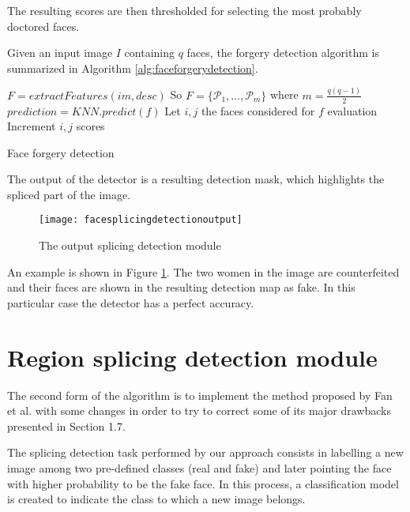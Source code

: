 The resulting scores are then thresholded for selecting the most probably doctored faces. 

Given an input image $I$ containing $q$ faces, the forgery detection algorithm is summarized in Algorithm \ref{alg:faceforgerydetection}.

\begin{algorithm}[!h]
\begin{algorithmic}[1]
\State $F = extractFeatures(im, desc)$
\State So $F = \{\mathcal{P}_1, \ldots, \mathcal{P}_m\} $ where $ m = \frac{q(q-1)}{2}$
\State $prediction = KNN.predict(f)$
\State Let $i, j$ the faces considered for $f$ evaluation
\State Increment $i, j$ scores
\EndIf
\EndFor
\EndFor
\EndFor
\end{algorithmic}\caption{Face forgery detection}\label{alg:faceforgerydetection}
\end{algorithm}

The output of the detector is a resulting detection mask, which highlights the spliced part of the image.

\begin{figure}[h!]
  \centering
    \texttt{[image: facesplicingdetectionoutput]}
    \caption{The output splicing detection module}
    \label{fig:facesplicingdetectionoutput}
\end{figure}

An example is shown in Figure \ref{fig:facesplicingdetectionoutput}. The two women in the image are counterfeited and their faces are shown in the resulting detection map as fake. In this particular case the detector has a perfect accuracy. 

\section{Region splicing detection module}

The second form of the algorithm is to implement the method proposed by Fan et al.\cite{fan2015image} with some changes in order to try to correct some of its major drawbacks presented in Section 1.7.

The splicing detection task performed by our approach consists in labelling a new image among two pre-defined classes (real and fake) and later pointing the face with higher probability to be the fake face. In this process, a classification model is created to indicate the class to which a new image belongs.


